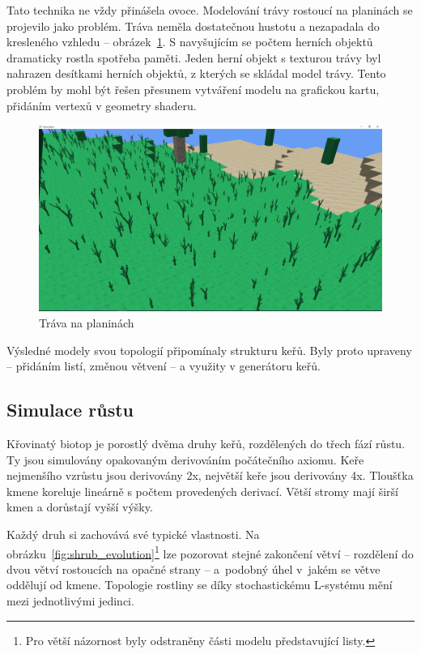 \documentclass[thesis=M,czech]{FITthesis}[2019/12/23]
\begin{document}
Tato technika ne vždy přinášela ovoce. Modelování trávy rostoucí na planinách se projevilo jako problém. Tráva neměla dostatečnou hustotu a nezapadala do kresleného vzhledu -- obrázek~\ref{fig:grass_plains}. S navyšujícím se počtem herních objektů dramaticky rostla spotřeba paměti. Jeden herní objekt s texturou trávy byl nahrazen desítkami herních objektů, z kterých se skládal model trávy. Tento problém by mohl být řešen přesunem vytváření modelu na grafickou kartu, přidáním vertexů v geometry shaderu.

\begin{figure}\centering
	\includegraphics[width=\textwidth]{images/grass_plains}
	\caption[Tráva na planinách]{Tráva na planinách}\label{fig:grass_plains}
\end{figure}

Výsledné modely svou topologií připomínaly strukturu keřů. Byly proto upraveny -- přidáním listí, změnou větvení -- a využity v generátoru keřů.

\subsection{Simulace růstu}
Křovinatý biotop je porostlý dvěma druhy keřů, rozdělených do třech fází růstu. Ty jsou simulovány opakovaným derivováním počátečního axiomu. Keře nejmenšího vzrůstu jsou derivovány 2x, největší keře jsou derivovány 4x. Tloušťka kmene koreluje lineárně s počtem provedených derivací. Větší stromy mají širší kmen a dorůstají vyšší výšky.

Každý druh si zachovává své typické vlastnosti. Na obrázku~\ref{fig:shrub_evolution}\footnote{Pro větší názornost byly odstraněny části modelu představující listy.}  lze pozorovat stejné zakončení větví -- rozdělení do dvou větví rostoucích na opačné strany -- a~podobný úhel v~jakém se větve oddělují od kmene. Topologie rostliny se díky stochastickému L-systému mění mezi jednotlivými jedinci.
\end{document}
